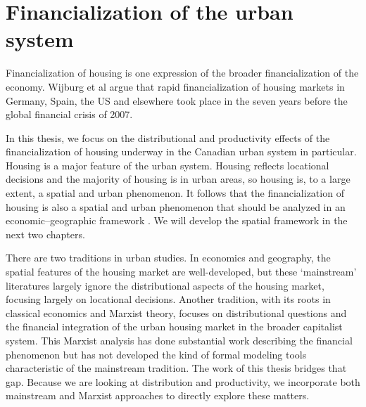 \section{Financialization of the urban system }



Financialization of housing %
is one expression of the broader financialization of the economy. Wijburg et al \cite{wijburgFinancialisationRentalHousing2018} argue that rapid financialization of housing markets in Germany, Spain, the US and elsewhere took place in the seven years before the global financial crisis of 2007. 

In this thesis, we focus on the distributional and productivity effects of the financialization of housing underway in the Canadian urban system in particular. Housing is a major feature of the urban system.  Housing reflects locational decisions and the majority of housing is in urban areas, so housing is, to a large extent, a spatial and urban phenomenon. It follows that the financialization of housing is also a spatial and urban phenomenon that should be analyzed in an economic–geographic framework \cite{aalbersPotentialFinancialization2015}. We will develop the spatial framework in the next two chapters. 

There are two traditions in urban studies. In economics and geography, the spatial features of the housing market are well-developed, but these `mainstream' literatures largely ignore the distributional aspects of the housing market, focusing largely on locational decisions. Another tradition, with its roots in \Gls{classical economics} and Marxist theory, focuses on distributional questions and the financial integration of the urban housing market in the broader capitalist system.  This Marxist analysis has done substantial work describing the financial phenomenon but has not developed the kind of formal modeling tools characteristic of the mainstream tradition.   The work of this thesis bridges that gap. Because we are looking at distribution and productivity, we incorporate both mainstream and Marxist approaches to directly explore these matters.


